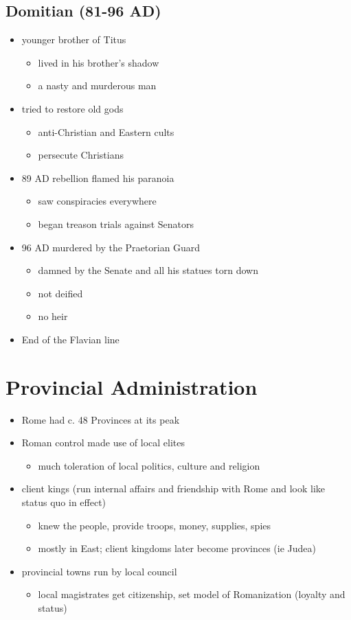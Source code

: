 \documentclass[12pt, twoside]{article}
\begin{document}
\subsection{Domitian (81-96 AD)}
\begin{itemize}
\item younger brother of Titus
	\begin{itemize}
	\item lived in his brother’s shadow
	\item a nasty and murderous man
	\end{itemize}
\item tried to restore old gods
	\begin{itemize}
	\item anti-Christian and Eastern cults
	\item persecute Christians
	\end{itemize}
\item 89 AD rebellion flamed his paranoia
	\begin{itemize}
	\item saw conspiracies everywhere
	\item began treason trials against Senators
	\end{itemize}
\item 96 AD murdered by the Praetorian Guard
	\begin{itemize}
	\item damned by the Senate and all his statues torn down
	\item not deified
	\item no heir
	\end{itemize}
\item End of the Flavian line
\end{itemize}

\section{Provincial Administration}
\begin{itemize}
\item Rome had c. 48 Provinces at its peak
\item Roman control made use of local elites
	\begin{itemize}
	\item much toleration of local politics, culture and religion
	\end{itemize}
\item client kings (run internal affairs and friendship with Rome and look like status quo in effect)
	\begin{itemize}
	\item knew the people, provide troops, money, supplies, spies
	\item mostly in East; client kingdoms later become provinces (ie Judea)
	\end{itemize}
\item provincial towns run by local council
	\begin{itemize}
	\item local magistrates get citizenship, set model of Romanization (loyalty and status)
	\end{itemize}
\end{itemize}
\end{document}
